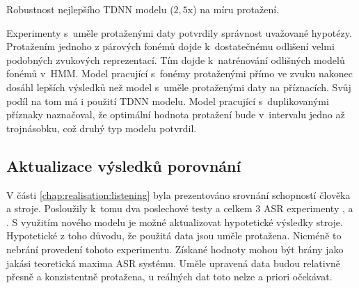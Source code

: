\begin{table}[htpb]
  \centering
  \def\arraystretch{1.5}
  \caption{Robustnost nejlepšího TDNN modelu ($2,5\mathrm{x}$) na míru protažení.}
  \label{tab:realisation:augmentation:influence:tdnn:robust}
\end{table}

Experimenty s~uměle protaženými daty potvrdily správnost uvažované hypotézy.
Protažením jednoho z párových fonémů dojde  k~dostatečnému odlišení velmi podobných zvukových reprezentací.
Tím dojde  k~natrénování odlišných modelů fonémů v~HMM.
Model pracující s~fonémy protaženými přímo ve zvuku nakonec dosáhl lepších výsledků než model s~uměle protaženými daty na příznacích.
Svůj podíl na tom má i použití TDNN modelu.
Model pracující s~duplikovanými příznaky naznačoval, že optimální hodnota protažení bude v~intervalu
jedno až trojnásobku, což druhý typ modelu potvrdil.

\subsection{Aktualizace výsledků porovnání}
\label{chap:realisation:augmentation:comparison}

V části \ref{chap:realisation:listening} byla prezentováno srovnání schopností člověka a stroje.
Posloužily  k~tomu dva poslechové testy a celkem $3$ ASR experimenty ,  a .
S využitím nového modelu je možné aktualizovat hypotetické výsledky stroje.
Hypotetické z toho důvodu, že použitá data jsou uměle protažena.
Nicméně to nebrání provedení tohoto experimentu.
Získané hodnoty mohou být brány jako jakási teoretická maxima ASR systému.
Uměle upravená data budou relativně přesně a konzistentně protažena, u reálných dat toto nelze a priori očekávat.

